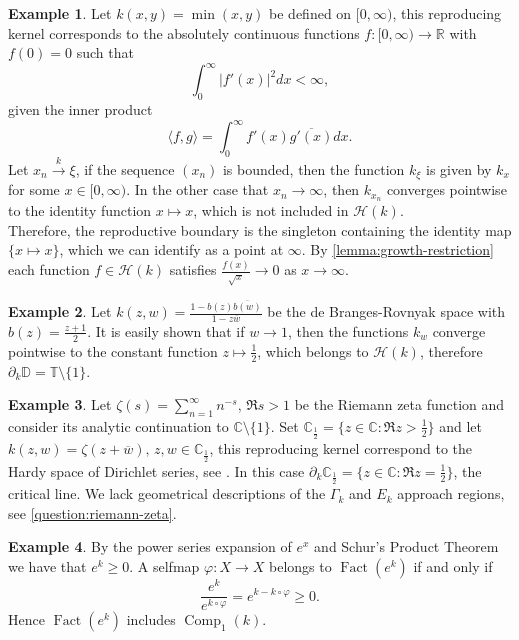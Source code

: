 \documentclass[leqno, final]{article}
\theoremstyle{definition}
\newtheorem{example}{Example}
\newcommand{\xto}[1]{\stackrel{#1}{\to}}
\newcommand{\reals}{\mathbb{R}}
\newcommand{\disk}{\mathbb{D}}
\newcommand{\plane}{\mathbb{C}}
\newcommand{\torus}{\mathbb{T}}
\newcommand{\Hilbert}{\mathcal{H}}
\newcommand{\rand}{\partial}
\renewcommand{\phi}{\varphi}
\newcommand{\la}{\langle}
\newcommand{\ra}{\rangle}
\DeclareMathOperator{\Fact}{Fact}
\DeclareMathOperator{\Comp}{Comp}
\begin{document}
\begin{example}
Let $k(x,y) = \min(x,y)$ be defined on $[0,\infty)$, this reproducing kernel corresponds
to the absolutely continuous functions $f:[0,\infty)\to\reals$ with $f(0) = 0$ such that \[
	\int_0^\infty |f'(x)|^2dx < \infty,
\]
 given the inner product \[
	\la f,g\ra = \int_0^\infty f'(x)\overline{g'(x)}dx.
\]
Let $x_n\xto{k}\xi$, if the sequence $(x_n)$ is bounded, then the function $k_\xi$ is
given by $k_x$ for some $x\in[0,\infty)$. In the other case that $x_n\to\infty$, then
$k_{x_n}$ converges pointwise to the identity function $x\mapsto x$, which is not included
in $\Hilbert(k)$.
\\ Therefore, the reproductive boundary is the singleton containing the identity map $\{x\mapsto x\}$,
which we can identify as a point at $\infty$. By \cref{lemma:growth-restriction} each function
$f\in\Hilbert(k)$ satisfies $\frac{f(x)}{\sqrt{x}}\to0$ as $x\to\infty$.
\end{example}

\begin{example}
Let $k(z,w) = \frac{1-b(z)\overline{b(w)}}{1-z\overline w}$ be the de Branges-Rovnyak space with
$b(z) = \frac{z+1}2$. It is easily shown that if $w\to1$, then the functions $k_w$
converge pointwise to the constant function $z\mapsto\frac12$, which belongs to $\Hilbert(k)$,
therefore $\rand_k\disk = \torus\setminus\{1\}$.
\end{example}

\begin{example}\label{example:riemann-zeta}
Let $\zeta(s) = \sum_{n=1}^\infty n^{-s},\,\Re{s}>1$ be the Riemann zeta function and
consider its analytic continuation to $\plane\setminus\{1\}$.
Set $\plane_\frac12 = \{z\in\plane:\Re{z}>\frac12\}$ and
let $k(z,w) = \zeta(z + \overline w),\,z,w\in\plane_\frac12$, this reproducing kernel
correspond to the Hardy space of Dirichlet series, see \cite{hedenmalm-seip_hardy}.
In this case $\rand_k\plane_\frac12 = \{z\in\plane:\Re{z}=\frac12\}$, the critical
line. We lack geometrical descriptions of the $\Gamma_k$ and $E_k$ approach regions,
see \cref{question:riemann-zeta}.
\end{example}

\begin{example}
By the power series expansion of $e^x$ and Schur's Product Theorem we have that
$e^k\geq0$. A selfmap $\phi:X\to X$ belongs to $\Fact(e^k)$ if and only if \[
	\frac{e^k}{e^{k\circ\phi}} = e^{k-k\circ\phi}\geq0.
\]
Hence $\Fact(e^k)$ includes $\Comp_1(k)$.
\end{example}
\end{document}
